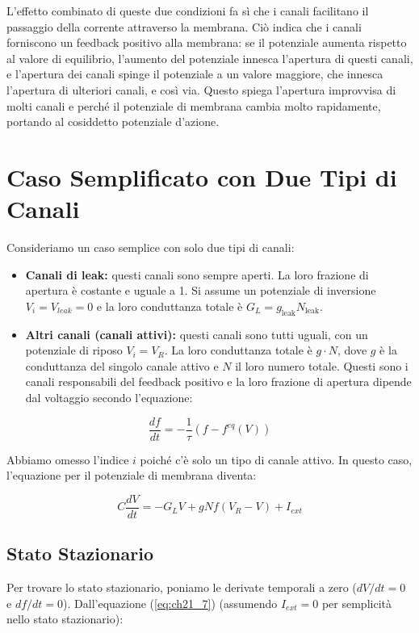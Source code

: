 L'effetto combinato di queste due condizioni fa sì che i canali facilitano il passaggio della corrente attraverso la membrana. Ciò indica che i canali forniscono un feedback positivo alla membrana: se il potenziale aumenta rispetto al valore di equilibrio, l'aumento del potenziale innesca l'apertura di questi canali, e l'apertura dei canali spinge il potenziale a un valore maggiore, che innesca l'apertura di ulteriori canali, e così via. Questo spiega l'apertura improvvisa di molti canali e perché il potenziale di membrana cambia molto rapidamente, portando al cosiddetto potenziale d'azione.


\section{Caso Semplificato con Due Tipi di Canali}
Consideriamo un caso semplice con solo due tipi di canali:
\begin{itemize}
    \item \textbf{Canali di leak:} questi canali sono sempre aperti. La loro frazione di apertura è costante e uguale a 1. Si assume un potenziale di inversione $V_i = V_{leak} = 0$ e la loro conduttanza totale è $G_L = g_{\text{leak}}N_{\text{leak}}$.
    \item \textbf{Altri canali (canali attivi):} questi canali sono tutti uguali, con un potenziale di riposo $V_i = V_R$. La loro conduttanza totale è $g \cdot N$, dove $g$ è la conduttanza del singolo canale attivo e $N$ il loro numero totale. Questi sono i canali responsabili del feedback positivo e la loro frazione di apertura dipende dal voltaggio secondo l'equazione:
\end{itemize}

\begin{equation} \label{eq:ch21_6}
\frac{df}{dt} = -\frac{1}{\tau}(f - f^{eq}(V))
\end{equation}

Abbiamo omesso l'indice $i$ poiché c'è solo un tipo di canale attivo.
In questo caso, l'equazione per il potenziale di membrana diventa:

\begin{equation} \label{eq:ch21_7}
C\frac{dV}{dt} = -G_L V + gNf(V_R - V) + I_{ext}
\end{equation}

\subsection*{Stato Stazionario}
Per trovare lo stato stazionario, poniamo le derivate temporali a zero ($dV/dt = 0$ e $df/dt = 0$).
Dall'equazione (\ref{eq:ch21_7}) (assumendo $I_{ext}=0$ per semplicità nello stato stazionario):

